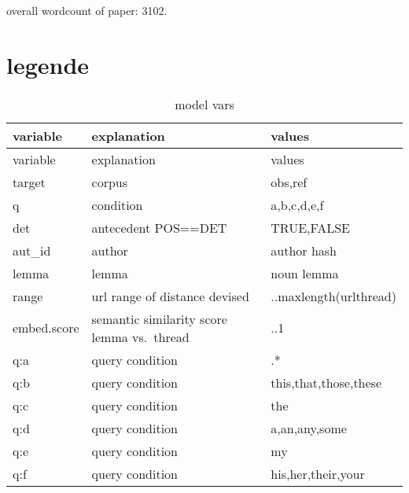 \documentclass[
  12pt,
  oneside]{book}
\begin{document}
overall wordcount of paper: 3102.

\section{legende}\label{legende}

\begin{longtable}[]{@{}
  >{\raggedright\arraybackslash}p{}
  >{\raggedright\arraybackslash}p{}
  >{\raggedright\arraybackslash}p{}@{}}
\caption{\label{tab:legend}model vars}\tabularnewline
\toprule\noalign{}
\begin{minipage}[b]{\linewidth}\raggedright
variable
\end{minipage} & \begin{minipage}[b]{\linewidth}\raggedright
explanation
\end{minipage} & \begin{minipage}[b]{\linewidth}\raggedright
values
\end{minipage} \\
\midrule\noalign{}
\endfirsthead
\toprule\noalign{}
\begin{minipage}[b]{\linewidth}\raggedright
variable
\end{minipage} & \begin{minipage}[b]{\linewidth}\raggedright
explanation
\end{minipage} & \begin{minipage}[b]{\linewidth}\raggedright
values
\end{minipage} \\
\midrule\noalign{}
\endhead
\bottomrule\noalign{}
\endlastfoot
target & corpus & obs,ref \\
q & condition & a,b,c,d,e,f \\
det & antecedent POS==DET & TRUE,FALSE \\
aut\_id & author & author hash \\
lemma & lemma & noun lemma \\
range & url range of distance devised & 1..maxlength(urlthread) \\
embed.score & semantic similarity score lemma vs.~thread & 0..1 \\
q:a & query condition & .* \\
q:b & query condition & this,that,those,these \\
q:c & query condition & the \\
q:d & query condition & a,an,any,some \\
q:e & query condition & my \\
q:f & query condition & his,her,their,your \\
\end{longtable}
\end{document}
